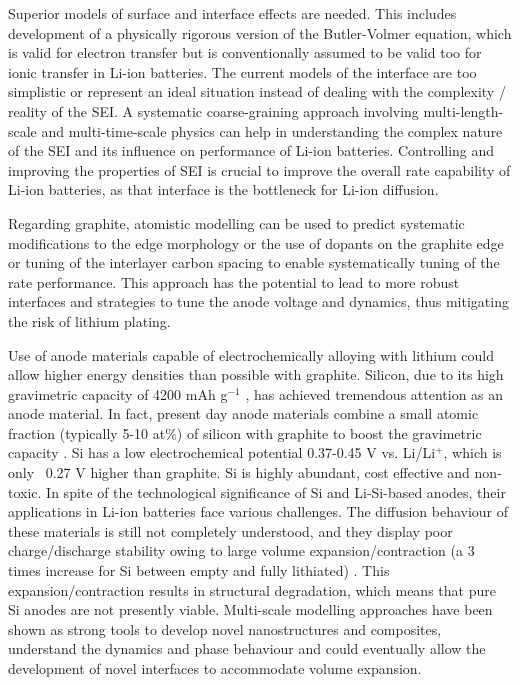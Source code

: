 \documentclass[../main.tex]{subfiles}
\begin{document}
Superior models of surface and interface effects are needed. This includes development of a physically rigorous version of the Butler-Volmer equation, which is valid for electron transfer but is conventionally assumed to be valid too for ionic transfer in Li-ion batteries. The current models of the interface are too simplistic or represent an ideal situation instead of dealing with the complexity / reality of the SEI. A systematic coarse-graining approach involving multi-length-scale and multi-time-scale physics can help in understanding the complex nature of the SEI and its influence on performance of Li-ion batteries. Controlling and improving the properties of SEI is crucial to improve the overall rate capability of Li-ion batteries, as that interface is the bottleneck for Li-ion diffusion.

Regarding graphite, atomistic modelling can be used to predict systematic modifications to the edge morphology or the use of dopants on the graphite edge \cite{peng2020lithium,weydanz1994behavior,way1994effect} or tuning of the interlayer carbon spacing \cite{JI201866} to enable systematically tuning of the rate performance. This approach has the potential to lead to more robust interfaces and strategies to tune the anode voltage and dynamics, thus mitigating the risk of lithium plating.

Use of anode materials capable of electrochemically alloying with lithium could allow higher energy densities than possible with graphite. Silicon, due to its high gravimetric capacity of 4200 mAh g$^{-1}$ , has achieved tremendous attention as an anode material. \cite{larcher2007recent} In fact, present day anode materials combine a small atomic fraction (typically 5-10 at\%) of silicon with graphite to boost the gravimetric capacity \cite{asenbauer_success_2020}. Si has a low electrochemical potential 0.37-0.45 V vs. Li/Li$^+$, which is only ~0.27 V higher than graphite. \cite{feng-Small-2018}  Si is highly abundant, cost effective and non-toxic. \cite{nitta2014high, feng-Small-2018,Wagner-JPS-2019} In spite of the technological significance of Si and Li-Si-based anodes, their applications in Li-ion batteries face various challenges. The diffusion behaviour of these materials is still not completely understood, and they display poor charge/discharge stability owing to large volume expansion/contraction (a 3 times increase for Si between empty and fully lithiated) \cite{Wang-JPS-2014,Wagner-JPS-2019,feng-Small-2018}. This expansion/contraction results in structural degradation, which means that pure Si anodes are not presently viable. Multi-scale modelling approaches have been shown as strong tools to develop novel nanostructures and composites, understand the dynamics and phase behaviour and could eventually allow the development of novel interfaces to accommodate volume expansion.\cite{feng-Small-2018}
\end{document}
